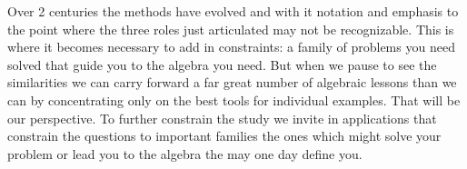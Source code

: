Over 2 centuries the methods have evolved and with it notation and emphasis to
the point where the three roles just articulated may not be recognizable.  
This is where it becomes necessary to add in constraints: a family of problems 
you need solved that guide you to the algebra you need.  But when we pause to see 
the similarities we can carry forward a far great number of algebraic lessons 
than we can by concentrating only on the best tools for individual examples.
That will be our perspective.  To further constrain the study we invite in 
applications that constrain the questions to important families the ones
which might solve your problem or lead you to the algebra the may one day define you.

